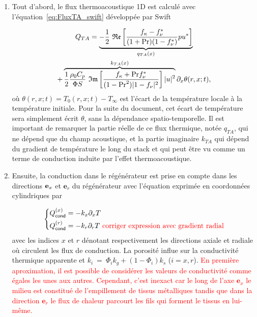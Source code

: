 \begin{enumerate}[label=\textbf{(\roman*)}]
\item Tout d'abord, le flux thermoacoustique 1D est calculé avec l'équation~\eqref{eq:FluxTA_swift} développée par Swift \cite{swift_thermoacoustics_2017}

\begin{multline}
	Q_{TA} = \underbrace{ -\frac12~\mathfrak{Re}\left[ \frac{ f_\kappa-f_\nu^* }{ (1+\mathrm{Pr})(1-f_\nu^*) } pu^* \right] }_{q_{TA}(x)} \\ 
	+ \overbrace{ \frac12 \frac{\rho_0 C_p}{\Phi S}~\mathfrak{Im}\left[ \frac{f_\kappa + \mathrm{Pr} f_\nu^*}{(1-\mathrm{Pr}^2)|1-f_\nu|^2} \right] |u|^2 }^{k_{TA}(x)}\partial_x \theta(r,x;t),
\label{eq:FluxTA_Lotton_Regen}
\end{multline}
où $\theta(r,x;t) = T_0(r,x;t)-T_\infty$ est l'écart de la température locale à la température initiale. Pour la suite du document, cet écart de température sera simplement écrit $\theta$, sans la dépendance spatio-temporelle. Il est important de remarquer la partie réelle de ce flux thermique, notée $q_{TA}$, qui ne dépend que du champ acoustique, et la partie imaginaire $k_{TA}$ qui dépend du gradient de température le long du stack et qui peut être vu comme un terme de conduction induite par l'effet thermoacoustique.

\item Ensuite, la conduction dans le régénérateur est prise en compte dans les directions $\textbf e_x$ et $\textbf{e}_r$ du régénérateur avec l'équation exprimée en coordonnées cylindriques par


\begin{equation}
	\left\{ \begin{aligned}
		Q_{\sf cond}^{(x)} &= -k_x \partial_x T\\
		Q_{\sf cond}^{(r)} &= -k_r \partial_r T \textcolor{red}{\text{ corriger expression avec gradient radial}}
	\end{aligned}\right.
	\label{eq:FluxCond_Lotton}
\end{equation}
avec les indices $x$ et $r$ dénotant respectivement les directions axiale et radiale où circulent les flux de conduction. La porosité influe sur la conductivité thermique apparente et $k_i~=~\Phi_i k_{g} + (1-\Phi_i)k_{s}$ ($i=x,r$). \textcolor{red}{En première aproximation, il est possible de considérer les valeurs de conductivité comme égales les unes aux autres. Cependant, c'est inexact car le long de l'axe $\mathbf e_x$ le milieu est constitué de l'empillement de tissus métalliques tandis que dans la direction $\mathbf e_r$ le flux de chaleur parcourt les fils qui forment le tissus en lui-même.}


\end{enumerate}
